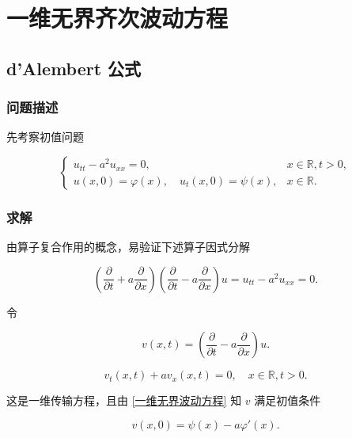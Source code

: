 \documentclass[12pt,a4paper]{article}
\numberwithin{subsection}{section}   %
\numberwithin{subsubsection}{subsection}
\theoremstyle{plain}
\theoremstyle{definition}
\theoremstyle{remark}
\theoremstyle{remark}
\begin{document}
	\newpage
	
	\section{一维无界齐次波动方程}
	
	\subsection{d’Alembert 公式}
	
	\subsubsection{问题描述}
	先考察初值问题
	
	\begin{equation}\label{一维无界波动方程}
		\begin{cases}
			u_{tt} - a^2 u_{xx} = 0, & x \in \mathbb{R}, t > 0, \\
			u(x, 0) = \varphi(x), \quad u_t(x, 0) = \psi(x), & x \in \mathbb{R}.
		\end{cases}
	\end{equation}
	
\subsubsection{求解}
	由算子复合作用的概念，易验证下述算子因式分解
	
	\begin{equation}
		\left( \frac{\partial}{\partial t} + a \frac{\partial}{\partial x} \right) \left( \frac{\partial}{\partial t} - a \frac{\partial}{\partial x} \right) u = u_{tt} - a^2 u_{xx} = 0.
	\end{equation}
	
	令
	
	\begin{equation}
		v(x, t) = \left( \frac{\partial}{\partial t} - a \frac{\partial}{\partial x} \right) u.
	\end{equation}
	
	\begin{equation}
	v_t(x, t) + a v_x(x, t) = 0, \quad x \in \mathbb{R}, t > 0.
\end{equation}
	
	这是一维传输方程，且由 \eqref{一维无界波动方程} 知 \(v\) 满足初值条件
	
	\begin{equation}
	v(x, 0) = \psi(x) - a \varphi'(x).
\end{equation}
	
\end{document}
